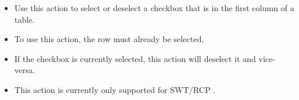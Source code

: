 
\begin{itemize}
\item Use this action to select or deselect a checkbox that is in the first column of a table.
\item To use this action, the row must already be selected. 
\item If the checkbox is currently selected, this action will deselect it and vice-versa.
\item This action is currently only supported for SWT/RCP \gdauts{}.
\end{itemize}
